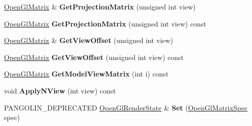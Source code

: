 \begin{DoxyCompactItemize}
\item 
\hyperlink{structpangolin_1_1_open_gl_matrix}{Open\+Gl\+Matrix} \& {\bfseries Get\+Projection\+Matrix} (unsigned int view)\hypertarget{classpangolin_1_1_open_gl_render_state_aa3780f73bef84f59301bb845e81dc4e8}{}\label{classpangolin_1_1_open_gl_render_state_aa3780f73bef84f59301bb845e81dc4e8}

\item 
\hyperlink{structpangolin_1_1_open_gl_matrix}{Open\+Gl\+Matrix} {\bfseries Get\+Projection\+Matrix} (unsigned int view) const \hypertarget{classpangolin_1_1_open_gl_render_state_a9482f7b592735a983898a39d74b055b8}{}\label{classpangolin_1_1_open_gl_render_state_a9482f7b592735a983898a39d74b055b8}

\item 
\hyperlink{structpangolin_1_1_open_gl_matrix}{Open\+Gl\+Matrix} \& {\bfseries Get\+View\+Offset} (unsigned int view)\hypertarget{classpangolin_1_1_open_gl_render_state_ac90f053eb6fdf41fdfaad4b28f539f07}{}\label{classpangolin_1_1_open_gl_render_state_ac90f053eb6fdf41fdfaad4b28f539f07}

\item 
\hyperlink{structpangolin_1_1_open_gl_matrix}{Open\+Gl\+Matrix} {\bfseries Get\+View\+Offset} (unsigned int view) const \hypertarget{classpangolin_1_1_open_gl_render_state_a986039192bb5d6e0b58d4444b98327aa}{}\label{classpangolin_1_1_open_gl_render_state_a986039192bb5d6e0b58d4444b98327aa}

\item 
\hyperlink{structpangolin_1_1_open_gl_matrix}{Open\+Gl\+Matrix} {\bfseries Get\+Model\+View\+Matrix} (int i) const \hypertarget{classpangolin_1_1_open_gl_render_state_a07c1b80d2906dd5e673a71237ddb2094}{}\label{classpangolin_1_1_open_gl_render_state_a07c1b80d2906dd5e673a71237ddb2094}

\item 
void {\bfseries Apply\+N\+View} (int view) const \hypertarget{classpangolin_1_1_open_gl_render_state_a34b748da7f057970d26792dc32562364}{}\label{classpangolin_1_1_open_gl_render_state_a34b748da7f057970d26792dc32562364}

\item 
P\+A\+N\+G\+O\+L\+I\+N\+\_\+\+D\+E\+P\+R\+E\+C\+A\+T\+ED \hyperlink{classpangolin_1_1_open_gl_render_state}{Open\+Gl\+Render\+State} \& {\bfseries Set} (\hyperlink{structpangolin_1_1_open_gl_matrix_spec}{Open\+Gl\+Matrix\+Spec} spec)\hypertarget{classpangolin_1_1_open_gl_render_state_a4d9aea432fe43ea1c6daba6febdf0bfa}{}\label{classpangolin_1_1_open_gl_render_state_a4d9aea432fe43ea1c6daba6febdf0bfa}

\end{DoxyCompactItemize}

